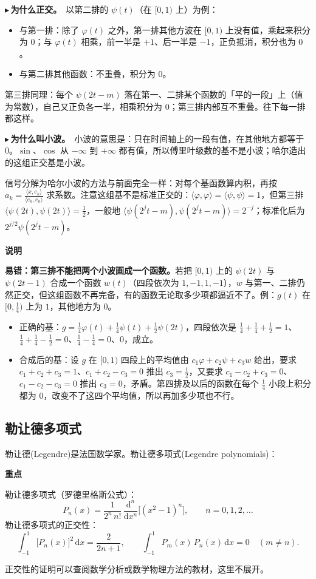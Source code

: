 \documentclass[UTF8,a4paper,11pt]{ctexart}
\newenvironment{remember}{\begin{rememberbox}\textbf{重点}\par\smallskip}{\end{rememberbox}}
\newenvironment{note}{\begin{notebox}\textbf{说明}\par\smallskip}{\end{notebox}}
\newcounter{ex}[section]
\newcommand{\point}[1]{\par\addvspace{1ex}\noindent\textcolor{ptteal}{$\blacktriangleright$\,\textbf{#1}}\ }
\begin{document}
\point{为什么正交。}以第二排的 $\psi(t)$（在 $[0,1)$ 上）为例：
\begin{itemize}[nosep]
\item 与第一排：除了 $\varphi(t)$ 之外，第一排其他方波在 $[0,1)$ 上没有值，乘起来积分为 $0$；与 $\varphi(t)$ 相乘，前一半是 $+1$、后一半是 $-1$，正负抵消，积分也为 $0$。
\item 与第二排其他函数：不重叠，积分为 $0$。
\end{itemize}
第三排同理：每个 $\psi(2t-m)$ 落在第一、二排某个函数的「平的一段」上（值为常数），自己又正负各一半，相乘积分为 $0$；第三排内部互不重叠。往下每一排都这样。

\point{为什么叫小波。}小波的意思是：只在时间轴上的一段有值，在其他地方都等于 $0$。$\sin$、$\cos$ 从 $-\infty$ 到 $+\infty$ 都有值，所以傅里叶级数的基不是小波；哈尔造出的这组正交基是小波。

信号分解为哈尔小波的方法与前面完全一样：对每个基函数算内积，再按 $a_k=\frac{\langle x,e_k\rangle}{\langle e_k,e_k\rangle}$ 求系数。注意这组基不是标准正交的：$\langle\varphi,\varphi\rangle=\langle\psi,\psi\rangle=1$，但第三排 $\langle\psi(2t),\psi(2t)\rangle=\frac12$，一般地 $\langle\psi(2^jt-m),\psi(2^jt-m)\rangle=2^{-j}$；标准化后为 $2^{j/2}\psi(2^jt-m)$。

\begin{note}
\textbf{易错：第三排不能把两个小波画成一个函数。}若把 $[0,1)$ 上的 $\psi(2t)$ 与 $\psi(2t-1)$ 合成一个函数 $w(t)$（四段依次为 $1,-1,1,-1$），$w$ 与第一、二排仍然正交，但这组函数不再完备，有的函数无论取多少项都逼近不了。例：$g(t)$ 在 $[0,\frac14)$ 上为 $1$，其他地方为 $0$。
\begin{itemize}[nosep]
\item 正确的基：$g=\frac14\varphi(t)+\frac14\psi(t)+\frac12\psi(2t)$，四段依次是 $\frac14+\frac14+\frac12=1$、$\frac14+\frac14-\frac12=0$、$\frac14-\frac14=0$、$0$，成立。
\item 合成后的基：设 $g$ 在 $[0,1)$ 四段上的平均值由 $c_1\varphi+c_2\psi+c_3w$ 给出，要求 $c_1+c_2+c_3=1$、$c_1+c_2-c_3=0$ 推出 $c_3=\frac12$，又要求 $c_1-c_2+c_3=0$、$c_1-c_2-c_3=0$ 推出 $c_3=0$，矛盾。第四排及以后的函数在每个 $\frac14$ 小段上积分都为 $0$，改变不了这四个平均值，所以再加多少项也不行。
\end{itemize}
\end{note}

\subsection{勒让德多项式}\label{sub:legendre}
勒让德(Legendre)是法国数学家。勒让德多项式(Legendre polynomials)：
\begin{remember}
勒让德多项式（罗德里格斯公式）：
\[
P_n(x)=\frac{1}{2^n\,n!}\,\frac{\mathrm{d}^n}{\mathrm{d}x^n}\big[(x^2-1)^n\big],\qquad n=0,1,2,\dots
\]
勒让德多项式的正交性：
\[
\int_{-1}^{1}\big[P_n(x)\big]^2\,\mathrm{d}x=\frac{2}{2n+1},\qquad
\int_{-1}^{1}P_m(x)\,P_n(x)\,\mathrm{d}x=0\quad(m\ne n).
\]
\end{remember}
正交性的证明可以查阅数学分析或数学物理方法的教材，这里不展开。
\end{document}

